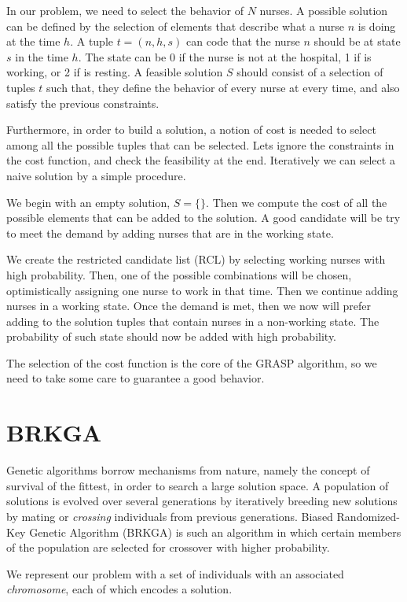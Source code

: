 \documentclass[12pt,a4paper]{article}
\begin{document}
In our problem, we need to select the behavior of $N$ nurses. A possible 
solution can be defined by the selection of elements that describe what a nurse 
$n$ is doing at the time $h$. A tuple $t = (n, h, s)$ can code that the nurse 
$n$ should be at state $s$ in the time $h$. The state can be 0 if the nurse is 
not at the hospital, 1 if is working, or 2 if is resting. A feasible solution 
$S$ should consist of a selection of tuples $t$ such that, they define the 
behavior of every nurse at every time, and also satisfy the previous 
constraints.

Furthermore, in order to build a solution, a notion of cost is needed to select 
among all the possible tuples that can be selected. Lets ignore the constraints 
in the cost function, and check the feasibility at the end. Iteratively we can 
select a naive solution by a simple procedure.


We begin with an empty solution, $S=\{\}$. Then we compute the cost of all the 
possible elements that can be added to the solution. A good candidate will be 
try to meet the demand by adding nurses that are in the working state.

We create the restricted candidate list (RCL) by selecting working nurses with 
high probability. Then, one of the possible combinations will be chosen, 
optimistically assigning one nurse to work in that time.  Then we continue 
adding nurses in a working state.  Once the demand is met, then we now will 
prefer adding to the solution tuples that contain nurses in a non-working state.  
The probability of such state should now be added with high probability.

The selection of the cost function is the core of the GRASP algorithm, so we
need to take some care to guarantee a good behavior.
%
\section{BRKGA}
%
Genetic algorithms borrow mechanisms from nature, namely the concept of survival
of the fittest, in order to search a large solution space. A population of
solutions is evolved over several generations by iteratively breeding new
solutions by mating or \textit{crossing} individuals from previous generations.
Biased Randomized-Key Genetic Algorithm (BRKGA) is such an algorithm in which
certain members of the population are selected for crossover with higher
probability.

We represent our problem with a set of individuals with an associated
\textit{chromosome}, each of which encodes a solution.
\end{document}
